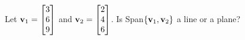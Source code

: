 \documentclass{ximera}
\newcommand{\bv}{{\bf v}}
\begin{document}
  	\begin{question}
  	Let $\bv_1 = \begin{bmatrix} 3\\6\\ 9\end{bmatrix}$  and $\bv_2 = \begin{bmatrix} 2\\4\\6\end{bmatrix}$. Is Span$\{\bv_1, \bv_2\}$ a line or a plane?
  		
  		
  		\begin{multipleChoice}
  		\end{multipleChoice}
  		
  	\end{question}
  	
  
  
\end{document}

